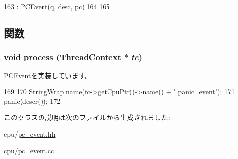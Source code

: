 \begin{DoxyCode}
163     : PCEvent(q, desc, pc)
164 {
165 }
\end{DoxyCode}


\subsection{関数}
\hypertarget{classPanicPCEvent_ad66a9d5ec7cfe597b848a17c0df5cc28}{
\subsubsection[{process}]{\setlength{\rightskip}{0pt plus 5cm}void process ({\bf ThreadContext} $\ast$ {\em tc})}}
\label{classPanicPCEvent_ad66a9d5ec7cfe597b848a17c0df5cc28}


\hyperlink{classPCEvent_af6ff225900b7b98c08880da7225b38f0}{PCEvent}を実装しています。


\begin{DoxyCode}
169 {
170     StringWrap name(tc->getCpuPtr()->name() + ".panic_event");
171     panic(descr());
172 }
\end{DoxyCode}


このクラスの説明は次のファイルから生成されました:\begin{DoxyCompactItemize}
\item 
cpu/\hyperlink{pc__event_8hh}{pc\_\-event.hh}\item 
cpu/\hyperlink{pc__event_8cc}{pc\_\-event.cc}\end{DoxyCompactItemize}
